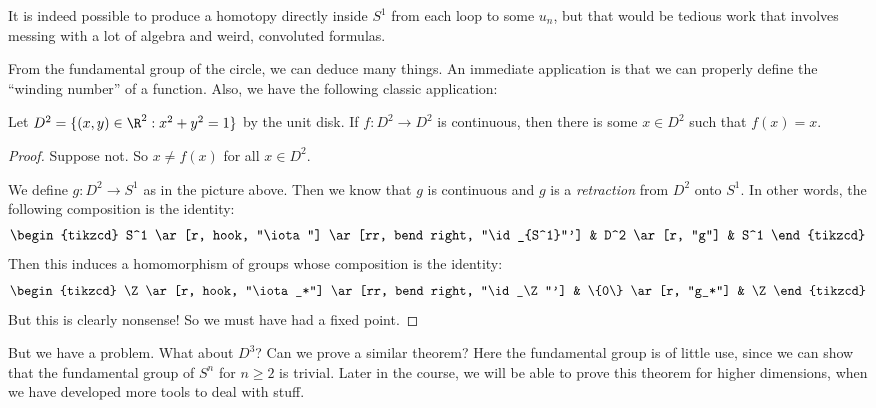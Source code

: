 \documentclass[a4paper]{article}
\begin{document}
It is indeed possible to produce a homotopy directly inside $S^1$ from each loop to some $u_n$, but that would be tedious work that involves messing with a lot of algebra and weird, convoluted formulas.

From the fundamental group of the circle, we can deduce many things. An immediate application is that we can properly define the ``winding number'' of a function. Also, we have the following classic application:
\begin{thm}
  Let $D^2 = \{(x, y) \in \R^2: x^2 + y^2 = 1\}$ by the unit disk. If $f: D^2 \to D^2$ is continuous, then there is some $x\in D^2$ such that $f(x) = x$.
\end{thm}

\begin{proof}
  Suppose not. So $x \not= f(x)$ for all $x\in D^2$.
  \begin{center}
  \end{center}
  We define $g: D^2 \to S^1$ as in the picture above. Then we know that $g$ is continuous and $g$ is a \emph{retraction} from $D^2$ onto $S^1$. In other words, the following composition is the identity:
  \[
    \begin{tikzcd}
      S^1 \ar[r, hook, "\iota"] \ar[rr, bend right, "\id_{S^1}"'] & D^2 \ar[r, "g"] & S^1
    \end{tikzcd}
  \]
  Then this induces a homomorphism of groups whose composition is the identity:
  \[
    \begin{tikzcd}
      \Z \ar[r, hook, "\iota_*"] \ar[rr, bend right, "\id_\Z"'] & \{0\} \ar[r, "g_*"] & \Z
    \end{tikzcd}
  \]
  But this is clearly nonsense! So we must have had a fixed point.
\end{proof}
But we have a problem. What about $D^3$? Can we prove a similar theorem? Here the fundamental group is of little use, since we can show that the fundamental group of $S^n$ for $n \geq 2$ is trivial. Later in the course, we will be able to prove this theorem for higher dimensions, when we have developed more tools to deal with stuff.
\end{document}

